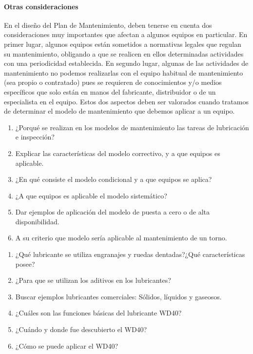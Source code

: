 \paragraph{ Otras consideraciones}
En el diseño del Plan de Mantenimiento, deben tenerse en cuenta dos consideraciones muy importantes que afectan a algunos equipos en particular. En
primer lugar, algunos equipos están sometidos a normativas legales que regulan su mantenimiento, obligando a que se realicen en ellos determinadas
actividades con una periodicidad establecida.
En segundo lugar, algunas de las actividades de mantenimiento no podemos realizarlas con el equipo habitual de mantenimiento (sea propio o
contratado) pues se requieren de conocimientos y/o medios específicos que
solo están en manos del fabricante, distribuidor o de un especialista en el
equipo.
Estos dos aspectos deben ser valorados cuando tratamos de determinar el
modelo de mantenimiento que debemos aplicar a un equipo.

\begin{enumerate}
    \item ¿Porqué se realizan en los modelos de mantenimiento las tareas de lubricación e inspección?
    \item Explicar las características del modelo correctivo, y a que equipos es aplicable.
    \item ¿En qué consiste el modelo condicional y a que equipos se aplica?
    \item ¿A que equipos es aplicable el modelo sistemático?
    \item Dar ejemplos de aplicación del modelo de puesta a cero o de alta disponibilidad.
    \item A su criterio que modelo sería aplicable al mantenimiento de un torno.
\end{enumerate}

\begin{enumerate}
    \item ¿Qué lubricante se utiliza engranajes y ruedas dentadas?¿Qué características posee?
    \item ¿Para que se utilizan los aditivos en los lubricantes?
    \item Buscar ejemplos lubricantes comerciales: Sólidos, líquidos y gaseosos.


\item ¿Cuáles son las funciones básicas del lubricante WD40?

\item ¿Cuándo y donde fue descubierto el WD40?

\item ¿Cómo se puede aplicar el WD40?

\end{enumerate}


